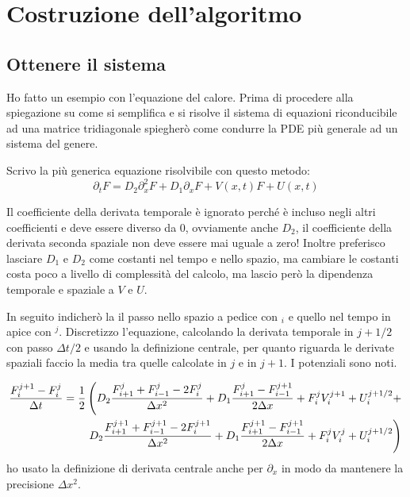 \section{Costruzione dell'algoritmo}
\subsection{Ottenere il sistema}
Ho fatto un esempio con l'equazione del calore. Prima di procedere alla spiegazione su come si semplifica e si risolve il sistema di equazioni riconducibile ad una matrice tridiagonale spiegher\`o come condurre la PDE pi\`u generale ad un sistema del genere.

Scrivo la pi\`u generica equazione risolvibile con questo metodo:
\begin{equation}\label{eq:generica}
  \partial_t F = D_2 \partial^2_x F + D_1 \partial_x F + V(x,t) F + U(x,t)
\end{equation}

Il coefficiente della derivata temporale \`e ignorato perch\'e \`e incluso negli altri coefficienti e deve essere diverso da 0, ovviamente anche $D_2$, il coefficiente della derivata seconda spaziale non deve essere mai uguale a zero!
Inoltre preferisco lasciare $D_1$ e $D_2$ come costanti nel tempo e nello spazio, ma cambiare le costanti costa poco a livello di complessit\`a del calcolo, ma lascio per\`o la dipendenza temporale e spaziale a $V$ e $U$.

In seguito indicher\`o la il passo nello spazio a pedice con $_i$ e quello nel tempo in apice con $^j$.
Discretizzo l'equazione, calcolando la derivata temporale in $j+1/2$ con passo $\Delta t/2$ e usando la definizione centrale, per quanto riguarda le derivate spaziali faccio la media tra quelle calcolate in $j$ e in $j+1$. I potenziali sono noti.

\begin{equation}
  \begin{aligned}
    \frac{F_i^{j+1} - F_i^j}{\Delta t} = \frac 12&\lr(.{D_2\frac{F^j_{i+1}+F^{j}_{i-1}-2F_i^{j}}{\Delta x^2} + D_1\frac{F^j_{i+1}-F^{j+1}_{i-1}}{2\Delta x} + F_i^j V_i^{j+1} + U_i^{j+1/2}+}\\
    &\lr.){D_2\frac{F^{j+1}_{i+1}+F^{j+1}_{i-1}-2F_i^{j+1}}{\Delta x^2} + D_1\frac{F^{j+1}_{i+1}-F^{j+1}_{i-1}}{2\Delta x} + F_i^{j} V_i^{j} + U_i^{j+1/2}}
  \end{aligned}
\end{equation}
ho usato la definizione di derivata centrale anche per $\partial_x$ in modo da mantenere la precisione $\Delta x^2$.

